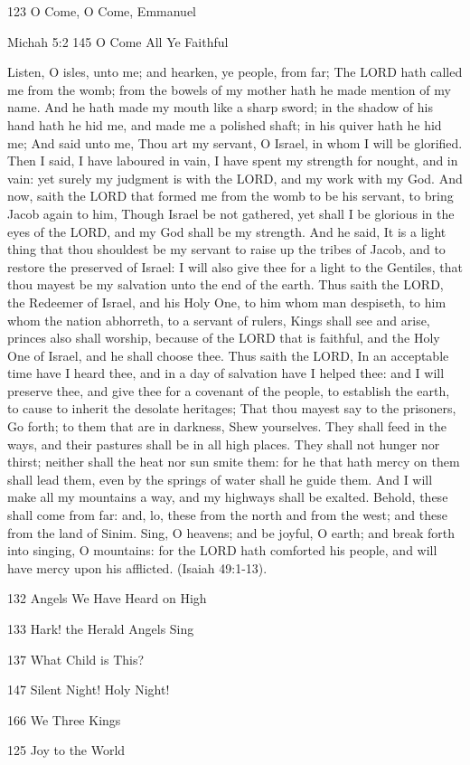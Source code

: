 \documentclass{article}
\begin{document}
123 O Come, O Come, Emmanuel

Michah 5:2
145 O Come All Ye Faithful


Listen, O isles, unto me; and hearken, ye people, from far; The LORD hath
called me from the womb; from the bowels of my mother hath he made mention
of my name. And he hath made my mouth like a sharp sword; in the shadow
of his hand hath he hid me, and made me a polished shaft; in his quiver
hath he hid me; And said unto me, Thou art my servant, O Israel, in whom
I will be glorified. Then I said, I have laboured in vain, I have spent
my strength for nought, and in vain: yet surely my judgment is with the
LORD, and my work with my God. And now, saith the LORD that formed me from
the womb to be his servant, to bring Jacob again to him, Though Israel
be not gathered, yet shall I be glorious in the eyes of the LORD, and my
God shall be my strength. And he said, It is a light thing that thou shouldest
be my servant to raise up the tribes of Jacob, and to restore the preserved
of Israel: I will also give thee for a light to the Gentiles, that thou
mayest be my salvation unto the end of the earth. Thus saith the LORD,
the Redeemer of Israel, and his Holy One, to him whom man despiseth, to
him whom the nation abhorreth, to a servant of rulers, Kings shall see
and arise, princes also shall worship, because of the LORD that is faithful,
and the Holy One of Israel, and he shall choose thee. Thus saith the LORD,
In an acceptable time have I heard thee, and in a day of salvation have
I helped thee: and I will preserve thee, and give thee for a covenant of
the people, to establish the earth, to cause to inherit the desolate heritages;
That thou mayest say to the prisoners, Go forth; to them that are in darkness,
Shew yourselves. They shall feed in the ways, and their pastures shall
be in all high places. They shall not hunger nor thirst; neither shall
the heat nor sun smite them: for he that hath mercy on them shall lead
them, even by the springs of water shall he guide them. And I will make
all my mountains a way, and my highways shall be exalted. Behold, these
shall come from far: and, lo, these from the north and from the west; and
these from the land of Sinim. Sing, O heavens; and be joyful, O earth;
and break forth into singing, O mountains: for the LORD hath comforted
his people, and will have mercy upon his afflicted. (Isaiah 49:1-13).

132 Angels We Have Heard on High

133 Hark! the Herald Angels Sing

137 What Child is This?

147 Silent Night! Holy Night!

166 We Three Kings

125 Joy to the World
\end{document}
